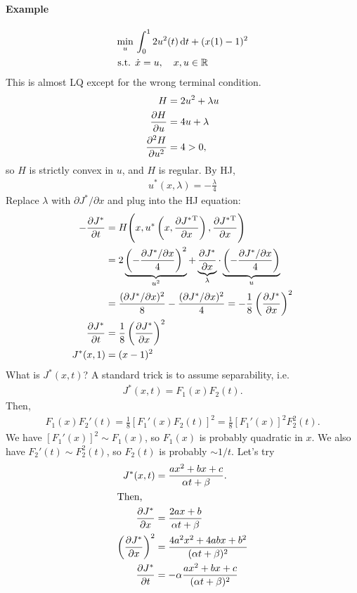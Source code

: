 \paragraph{Example} \mbox{}
\begin{align}
  \min_u {} & \int_0^1 2u^2(t)\mathop{}\!\mathrm{d} t + (x(1)-1)^2 \\
  \text{s.t. } & \dot x = u,\quad x,u\in\mathbb{R}
\end{align}
This is almost LQ except for the wrong terminal condition.
\begin{align}
  H &= 2u^2 + \lambda u \\
  \frac{\partial H}{\partial u} &= 4u + \lambda \\
  \frac{\partial ^2 H}{\partial u^2} &= 4 > 0,
\end{align}
so $H$ is strictly convex in $u$, and $H$ is regular. By HJ,
\begin{align}
  u^*(x,\lambda) = -\frac{\lambda}{4}
\end{align}
Replace $\lambda$ with $\partial J^*/\partial x$ and plug into the HJ equation:
\begin{align}
  -\frac{\partial J^*}{\partial t} &= H\Bigg( x, u^*\left(x,\frac{\partial J^*{}^\text{T}}{\partial x}\right), \frac{\partial J^*{}^\text{T}}{\partial x} \Bigg) \\
                 &= 2 \underbrace{\left( -\frac{\partial J^*/\partial x}{4} \right)^2}_{u^2} + \underbrace{\frac{\partial J^*}{\partial x}}_{\lambda} \cdot \underbrace{\left( -\frac{\partial J^*/\partial x}{4} \right)}_{u} \\
                 &= \frac{(\partial J^*/\partial x)^2}{8} - \frac{(\partial J^*/\partial x)^2}{4} = -\frac{1}{8} \left(\frac{\partial J^*}{\partial x}\right)^2 \\
  \frac{\partial J^*}{\partial t} &= \frac{1}{8} \left(\frac{\partial J^*}{\partial x}\right)^2 \\
  J^*(x,1) &= (x-1)^2
\end{align}
What is $J^*(x,t)$? A standard trick is to assume separability, i.e.\
\begin{gather}
  J^*(x,t) = F_1(x) F_2(t).
\end{gather}
Then,
\begin{gather}
  F_1(x) F_2'(t) = \frac{1}{8} [F_1'(x) F_2(t)]^2 = \frac{1}{8} [F_1'(x)]^2 F_2^2(t).
\end{gather}
We have $[F_1'(x)]^2\sim F_1(x)$, so $F_1(x)$ is probably quadratic in $x$. We also have $F_2'(t)\sim F_2^2(t)$, so $F_2(t)$ is probably $\sim 1/t$. Let's try
\begin{align}
  J^*(x,t) &= \frac{ax^2 + bx + c}{\alpha t + \beta}. \\
  \shortintertext{Then,}
  \frac{\partial J^*}{\partial x} &= \frac{2ax + b}{\alpha t + \beta} \\
  \left(\frac{\partial J^*}{\partial x}\right)^2 &= \frac{4a^2x^2 + 4abx + b^2}{(\alpha t + \beta)^2} \\
  \frac{\partial J^*}{\partial t} &= -\alpha \frac{ax^2 + bx + c}{(\alpha t + \beta)^2}
\end{align}
